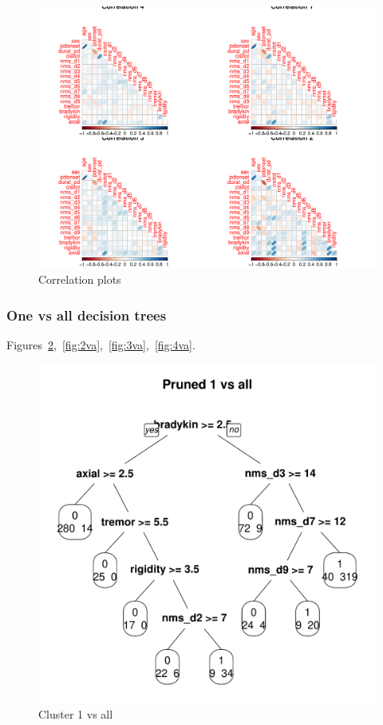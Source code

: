 \documentclass[letterpaper,12pt]{article}
\begin{document}
\begin{figure}[h]
  \centering
  \includegraphics[width=\linewidth]{corrplots.pdf}
  \caption{Correlation plots}
  \label{fig:corrplots}
\end{figure}

\subsubsection{One vs all decision trees}

Figures~\ref{fig:1va},~\ref{fig:2va},~\ref{fig:3va},~\ref{fig:4va}.

\begin{figure}[h]
  \centering
  \includegraphics[width=\linewidth]{dtree-1va-pruned.pdf}
  \caption{Cluster 1 vs all}
  \label{fig:1va}
\end{figure}
\end{document}
